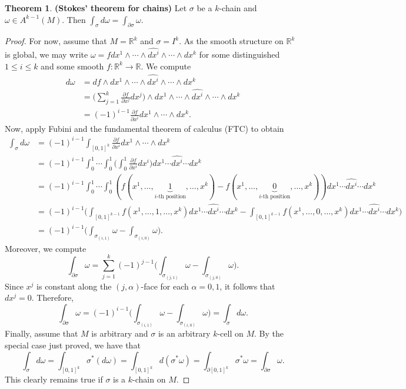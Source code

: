 \documentclass[10pt,letterpaper,cm]{nupset}
\theoremstyle{definition}
\newtheorem{theorem}{Theorem}
\newcommand{\R}{\mathbb R}
\newcommand{\1}{\mathbf{1}}
\newcommand{\0}{\vec 0}
\begin{document}
\begin{theorem}{\textbf{(Stokes' theorem for chains)}}
Let $\sigma$ be a $k$-chain and $\omega \in A^{k-1}(M)$. Then $\int_{\sigma} d\omega = \int_{\partial{\sigma}} \omega$.
\end{theorem}
\begin{proof}
For now, assume that $M= \R^k$ and $\sigma = I^k$. As the smooth structure on $\R^k$ is global, we may write $\omega = fdx^1 \wedge \cdots \wedge \widehat{dx^i} \wedge \cdots \wedge dx^k$ for some distinguished $1\leq i \leq k$ and some smooth $f: \R^k \to \R$. We compute 
\begin{align*}
 d\omega & = df \wedge dx^1 \wedge \cdots \wedge \widehat{dx^i} \wedge \cdots \wedge dx^k
\\ & = \big (\sum_{j=1}^k\frac{\partial{f}}{\partial{x^j}}dx^j \big)\wedge dx^1 \wedge \cdots \wedge \widehat{dx^i} \wedge \cdots \wedge dx^k
\\ & = (-1)^{i-1} \frac{\partial{f}}{\partial{x^i}}dx^1 \wedge \cdots \wedge dx^k.
\end{align*}
Now, apply Fubini and the fundamental theorem of calculus (FTC) to obtain
\begin{align*}
 \int_{\sigma}d\omega & = (-1)^{i-1}\int_{[0,1]^k} \frac{\partial{f}}{\partial{x^i}}dx^1 \wedge \cdots \wedge dx^k
\\ & = (-1)^{i-1}\int_0^1 \cdots \int_0^1 \big (\int_0^1  \frac{\partial{f}}{\partial{x^i}}dx^i \big)dx^1 \cdots \widehat{dx^i}  \cdots dx^k
\\ & = (-1)^{i-1}\int_0^1 \cdots \int_0^1(f(x^1, \ldots, \underbrace{1}_{i\text{-th position}}, \ldots, x^k) - f(x^1, \ldots, \underbrace{0}_{i\text{-th position}}, \ldots, x^k))dx^1 \cdots \widehat{dx^i}  \cdots dx^k
\\ & =  (-1)^{i-1}\big ( \int_{[0,1]^{k-1}} f(x^1, \ldots, 1, \ldots, x^k)dx^1 \cdots \widehat{dx^i}  \cdots dx^k -\int_{[0,1]^{k-1}}f(x^1, \ldots, 0, \ldots, x^k)dx^1 \cdots \widehat{dx^i}  \cdots dx^k \big )
\\ & = (-1)^{i-1}\big (\int_{\sigma_{(i, 1)}}\omega - \int_{\sigma_{(i, 0)}}\omega \big ) .
\end{align*}
Moreover, we compute
$$ \int_{\partial{\sigma}}\omega = \sum_{j=1}^k(-1)^{j-1}\big (\int_{\sigma_{(j, 1)}}\omega - \int_{\sigma_{(j, 0)}}\omega \big ).$$
Since $x^j$ is constant along the $(j, \alpha)$-face for each $\alpha = 0, 1$, it follows that $dx^j = 0$. Therefore, $$ \int_{\partial{\sigma}}\omega =   (-1)^{i-1}\big (\int_{\sigma_{(i, 1)}}\omega - \int_{\sigma_{(i, 0)}}\omega \big ) = \int_{\sigma} d\omega.$$
Finally, assume that $M$ is arbitrary and $\sigma $ is an arbitrary $k$-cell on $M$. By the special case just proved, we have that
$$  \int_{\sigma}d\omega = \int_{[0,1]^k}\sigma^{\ast}(d\omega) = \int_{[0,1]^k}d(\sigma^{\ast}\omega) = \int_{\partial{[0,1]^k}}\sigma^{\ast} \omega = \int_{\partial{\sigma}} \omega .$$
This clearly remains true if $\sigma$ is a $k$-chain on $M$.
\end{proof}
\end{document}
